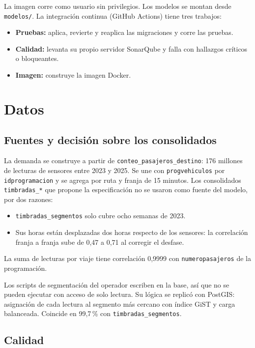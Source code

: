 \documentclass[10pt,a4paper]{article}
\newcommand{\cod}[1]{\texttt{\small #1}}
\begin{document}
La imagen corre como usuario sin privilegios. Los modelos se montan desde \cod{modelos/}. La integración continua (GitHub Actions) tiene tres trabajos:

\begin{itemize}
  \item \textbf{Pruebas:} aplica, revierte y reaplica las migraciones y corre las pruebas.
  \item \textbf{Calidad:} levanta su propio servidor SonarQube y falla con hallazgos críticos o bloqueantes.
  \item \textbf{Imagen:} construye la imagen Docker.
\end{itemize}

\section{Datos}

\subsection{Fuentes y decisión sobre los consolidados}

La demanda se construye a partir de \cod{conteo\_pasajeros\_destino}: 176 millones de lecturas de sensores entre 2023 y 2025. Se une con \cod{progvehiculos} por \cod{idprogramacion} y se agrega por ruta y franja de 15 minutos. Los consolidados \cod{timbradas\_*} que propone la especificación no se usaron como fuente del modelo, por dos razones:

\begin{itemize}
  \item \cod{timbradas\_segmentos} solo cubre ocho semanas de 2023.
  \item Sus horas están desplazadas dos horas respecto de los sensores: la correlación franja a franja sube de 0,47 a 0,71 al corregir el desfase.
\end{itemize}

La suma de lecturas por viaje tiene correlación 0,9999 con \cod{numeropasajeros} de la programación.

Los scripts de segmentación del operador escriben en la base, así que no se pueden ejecutar con acceso de solo lectura. Su lógica se replicó con PostGIS: asignación de cada lectura al segmento más cercano con índice GiST y carga balanceada. Coincide en 99,7\,\% con \cod{timbradas\_segmentos}.

\subsection{Calidad}
\end{document}
